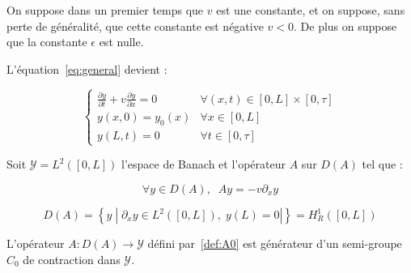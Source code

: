 \documentclass[a4paper]{article}
\begin{document}
On suppose dans un premier temps que $v$ est une constante, et on suppose,
sans perte de généralité, 
que cette constante est négative $v<0$.
De plus on suppose que la constante $\epsilon$ est nulle.

L'équation~\eqref{eq:general} devient :

\begin{equation}
\label{eq:cas0}
\begin{cases}
 \displaystyle \frac{\partial y}{\partial t}
 + v \frac{\partial y} {\partial x}  
 = 0  & \forall (x,t) \in [0,L] \times [0, \tau]\\
 y(x,0) = y_{0} (x) & \forall x \in [0,L] \\
 y(L,t) = 0 & \forall t \in [0,\tau]
\end{cases}
\end{equation}

Soit $\mathscr{Y} = L^2([0,L])$ l'espace de Banach et l'opérateur $A$ sur $D(A)$ tel que :

\begin{equation} 
	\label{def:A0}
	\forall y \in D(A), \; \; Ay = -v \partial_x y
\end{equation}

\[ D(A)=\left\{y \; | \; \partial_x y \in L^2 ([0,L]),\; y(L) =0| \right\} 
       = H_{R}^1([0,L])\]


\begin{proposition}
	\label{prop:cas0}
	L'opérateur $A: D(A) \to \mathscr{Y}$ défini par~\eqref{def:A0}
	est générateur d'un semi-groupe $C_0$ de contraction dans $\mathscr{Y}$.
\end{proposition}
\end{document}
